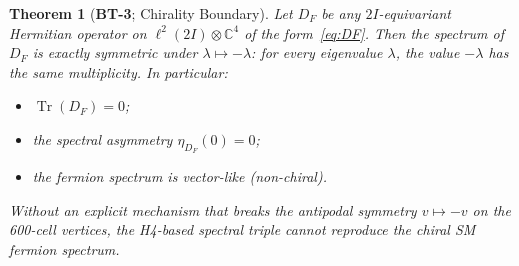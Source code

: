 \documentclass[12pt,a4paper]{article}
\newtheorem{theorem}{Theorem}[section]
\newcommand{\TwoI}{2I}
\newcommand{\BT}[1]{\textbf{BT-#1}}
\begin{document}
\begin{theorem}[\BT{3}; Chirality Boundary]
\label{thm:BT3}
Let \(D_F\) be any \(\TwoI\)-equivariant Hermitian operator on
\(\ell^2(\TwoI) \otimes \mathbb{C}^4\) of the form~\eqref{eq:DF}.
Then the spectrum of \(D_F\) is exactly symmetric under \(\lambda \mapsto -\lambda\):
for every eigenvalue \(\lambda\), the value \(-\lambda\) has the same multiplicity.
In particular:
\begin{itemize}
  \item \(\operatorname{Tr}(D_F) = 0\);
  \item the spectral asymmetry \(\eta_{D_F}(0) = 0\);
  \item the fermion spectrum is vector-like (non-chiral).
\end{itemize}
Without an explicit mechanism that breaks the antipodal symmetry \(v \mapsto -v\)
on the 600-cell vertices, the H4-based spectral triple cannot reproduce the chiral
SM fermion spectrum.
\end{theorem}
\end{document}
